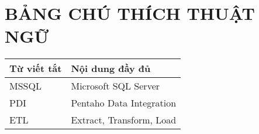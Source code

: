 
\pagebreak
{}
{}
\section*{\textbf{BẢNG CHÚ THÍCH THUẬT NGỮ}}

\begin{center}
\begin{tabular}{|p{3cm}|p{7cm}|}
\hline
\textbf{Từ viết tắt} & \textbf{Nội dung đầy đủ} \\
\hline
MSSQL & Microsoft SQL Server \\
\hline
PDI & Pentaho Data Integration \\
\hline
ETL & Extract, Transform, Load \\
\hline
\end{tabular}
\end{center}


\pagebreak
